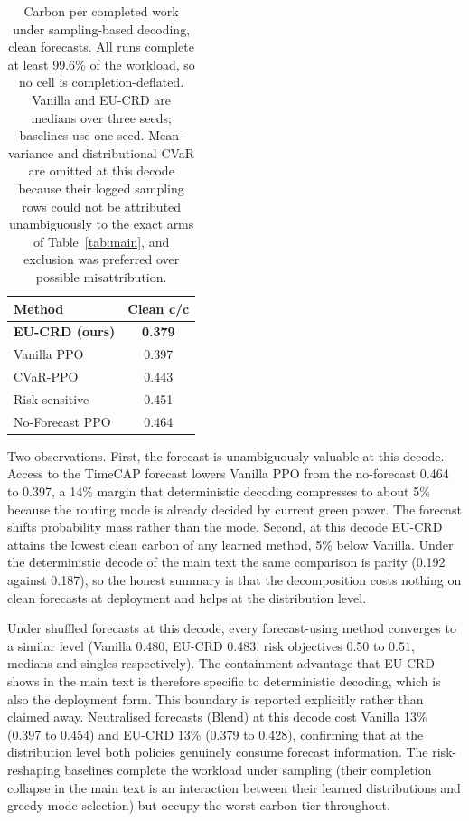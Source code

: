 \begin{table}[ht]
\caption{Carbon per completed work under sampling-based decoding, clean forecasts. All runs complete at least 99.6\% of the workload, so no cell is completion-deflated. Vanilla and EU-CRD are medians over three seeds; baselines use one seed. Mean-variance and distributional CVaR are omitted at this decode because their logged sampling rows could not be attributed unambiguously to the exact arms of Table~\ref{tab:main}, and exclusion was preferred over possible misattribution.}
\label{tab:stoch-clean}
\centering
\small
\begin{tabular*}{0.7\linewidth}{@{\extracolsep{\fill}}lc@{}}
\toprule
Method & Clean c/c \\
\midrule
\textbf{EU-CRD (ours)} & \textbf{0.379} \\
Vanilla PPO            & 0.397 \\
CVaR-PPO               & 0.443 \\
Risk-sensitive         & 0.451 \\
No-Forecast PPO        & 0.464 \\
\bottomrule
\end{tabular*}
\end{table}

Two observations. First, the forecast is unambiguously valuable at this decode. Access to the TimeCAP forecast lowers Vanilla PPO from the no-forecast 0.464 to 0.397, a 14\% margin that deterministic decoding compresses to about 5\% because the routing mode is already decided by current green power. The forecast shifts probability mass rather than the mode. Second, at this decode EU-CRD attains the lowest clean carbon of any learned method, 5\% below Vanilla. Under the deterministic decode of the main text the same comparison is parity (0.192 against 0.187), so the honest summary is that the decomposition costs nothing on clean forecasts at deployment and helps at the distribution level.

Under shuffled forecasts at this decode, every forecast-using method converges to a similar level (Vanilla 0.480, EU-CRD 0.483, risk objectives 0.50 to 0.51, medians and singles respectively). The containment advantage that EU-CRD shows in the main text is therefore specific to deterministic decoding, which is also the deployment form. This boundary is reported explicitly rather than claimed away. Neutralised forecasts (Blend) at this decode cost Vanilla 13\% (0.397 to 0.454) and EU-CRD 13\% (0.379 to 0.428), confirming that at the distribution level both policies genuinely consume forecast information. The risk-reshaping baselines complete the workload under sampling (their completion collapse in the main text is an interaction between their learned distributions and greedy mode selection) but occupy the worst carbon tier throughout.

